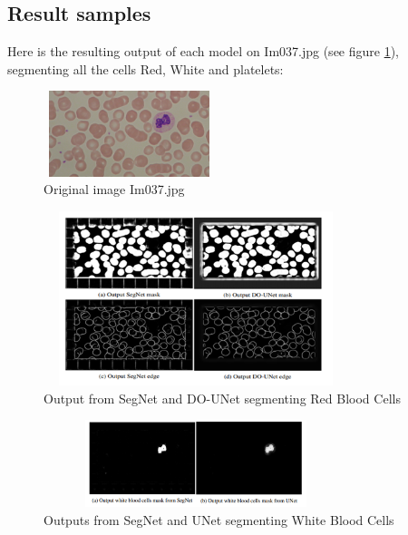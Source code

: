 \documentclass[conference]{IEEEtran}
\begin{document}


\subsection{Result samples}
\hspace{\parindent}
Here is the resulting output of each model on Im037.jpg (see figure \ref{fig:originalImage}), segmenting all the cells Red, White and platelets:
\vspace*{-0.5cm}
\begin{figure}[ht]
  \centering
\includegraphics[width = 5cm,height=2.5cm]{../images/originalCHT.jpg}
  \caption{Original image Im037.jpg}
  \label{fig:originalImage}
    \vspace*{-0.7cm}
\end{figure}

\begin{figure}[ht]
  \centering
  \includegraphics[width = 3.5in,height=2in]{../images/rbc.png}
  \caption{Output from SegNet and DO-UNet segmenting Red Blood Cells}
  \label{fig:rbc}
  \vspace*{-0.5cm}
\end{figure}

\begin{figure}[ht]
  \centering
  \includegraphics[width = 3.5in,height=1in]{../images/wbc.png}
  \caption{Outputs from SegNet and UNet segmenting White Blood Cells}
  \label{fig:wbc}
    \vspace*{-0.3cm}
\end{figure}
\end{document}
